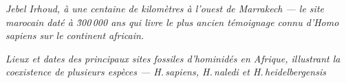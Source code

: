 \noindent\begin{minipage}[t][\textheight][s]{\textwidth}

\vspace*{\fill}

\begin{center}
    \noindent{}\par\vspace{-0.3em}
\end{center}
{\figcaptionname\itshape Jebel Irhoud, à une centaine de kilomètres à l'ouest de Marrakech
— le site marocain daté à \~300\,000 ans qui livre le plus ancien témoignage connu
d'\textit{Homo sapiens} sur le continent africain.}

\medskip  

\begin{center}
    \noindent{}\par\vspace{-0.3em}
\end{center}
{\figcaptionname\itshape Lieux et dates des principaux sites fossiles d'hominidés en
Afrique, illustrant la coexistence de plusieurs espèces — H.\,sapiens, H.\,naledi et H.\,heidelbergensis}

\vspace*{\fill}
\end{minipage}

